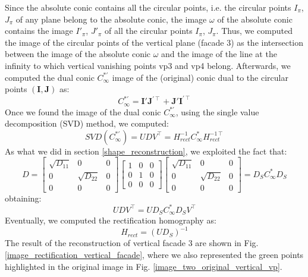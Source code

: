 \documentclass[11pt, oneside]{article}
\begin{document}
Since the absolute conic contains all the circular points, i.e. the circular points $\textit{I}_\pi$, $\textit{J}_\pi$ of any plane belong to the absolute conic, the image $\omega$ of the absolute conic contains the image $\textit{I}'_\pi$, $\textit{J}'_\pi$ of all the circular points $\textit{I}_\pi$, $\textit{J}_\pi$. Thus, we computed the image of the circular points of the vertical plane (facade 3) as the intersection between the image of the absolute conic $\omega$ and the image of the line at the infinity to which vertical vanishing points vp3 and vp4 belong. Afterwards, we computed the dual conic $C^{*'}_\infty$ image of the (original) conic dual to the circular points $(\textbf{I},\textbf{J})$ as:
\begin{equation}
	C^{*'}_\infty = \textbf{I}' \textbf{J}^{'\intercal} + \textbf{J}' \textbf{I}^{'\intercal}
\end{equation}
Once we found the image of the dual conic $C^{*'}_\infty$, using the single value decomposition (SVD) method, we computed:
\begin{equation}
	SVD(C^{*'}_\infty) = U D V^\intercal = H_{rect}^{-1} C^*_\infty H_{rect}^{-1\intercal}
\end{equation}
As what we did in section \ref{shape_reconstruction}, we exploited the fact that:
\begin{equation}
	D =
	\begin{bmatrix}
		\sqrt{D_{11}} & 0 & 0 \\ 0 & \sqrt{D_{22}} & 0 \\ 0 & 0 & 0
	\end{bmatrix}
	\begin{bmatrix}
		1 & 0 & 0 \\ 0 & 1 & 0 \\ 0 & 0 & 0
	\end{bmatrix}
	\begin{bmatrix}
		\sqrt{D_{11}} & 0 & 0 \\ 0 & \sqrt{D_{22}} & 0 \\ 0 & 0 & 0
	\end{bmatrix}
	= D_S C^*_\infty D_S
\end{equation}
obtaining:
\begin{equation}
	U D V^\intercal = U D_S C^*_\infty D_S V^\intercal
\end{equation}
Eventually, we computed the rectification homography as:
\begin{equation}
	H_{rect} = (U D_S)^{-1}
\end{equation}
The result of the reconstruction of vertical facade 3 are shown in Fig. \ref{image_rectification_vertical_facade}, where we also represented the green points highlighted in the original image in Fig. \ref{image_two_original_vertical_vp}.
\end{document}
